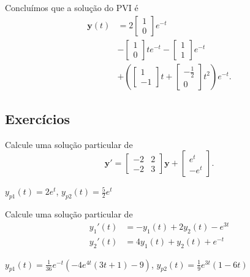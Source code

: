 \begin{resol}
  Concluímos que a solução do PVI é
  \begin{align}
    \pmb{y}(t) &= 2\begin{bmatrix}
                     1 \\ 0
                   \end{bmatrix}e^{-t} \\
               &- \begin{bmatrix}
                     1 \\
                     0
                   \end{bmatrix}te^{-t} -
    \begin{bmatrix}
        1 \\ 1
      \end{bmatrix}e^{-t} \\
               &+ \left(
      \begin{bmatrix}
        1 \\
        -1
      \end{bmatrix}t +
      \begin{bmatrix}
        -\frac{1}{2} \\
        0
      \end{bmatrix}t^2\right)e^{-t}.
  \end{align}  
\end{resol}

\subsection*{Exercícios}

\begin{exer}
  Calcule uma solução particular de
  \begin{equation}
    \pmb{y}' =
    \begin{bmatrix}
      -2 & 2 \\
      -2 & 3
    \end{bmatrix}\pmb{y} +
    \begin{bmatrix}
      e^{t} \\ -e^{t}
    \end{bmatrix}.
  \end{equation}
\end{exer}
\begin{resp}
  $y_{p1}(t) = 2 e^t$, $y_{p2}(t) = \frac{5}{2} e^t$
\end{resp}

\begin{exer}
  Calcule uma solução particular de
  \begin{align}
    y_1'(t) &= -y_1(t) + 2y_2(t) - e^{3t}\\
    y_2'(t) &= 4y_1(t) + y_2(t) + e^{-t}
  \end{align}
\end{exer}
\begin{resp}
  $y_{p1}(t) = \frac{1}{36} e^{-t} (-4 e^{4t} (3 t + 1) - 9)$, $y_{p2}(t) = \frac{1}{9} e^{3t} (1 - 6 t)$
\end{resp}

